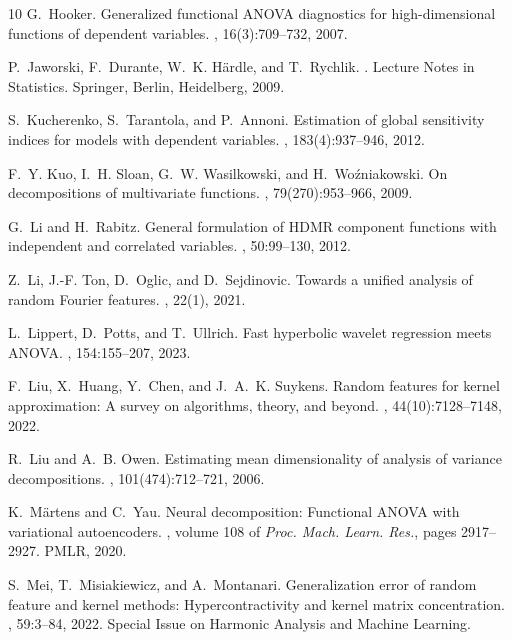 \documentclass{article}
\theoremstyle{definition}
\numberwithin{equation}{section}
\begin{document}
\begin{thebibliography}{10}
G.~Hooker.
\newblock Generalized functional {ANOVA} diagnostics for high-dimensional
  functions of dependent variables.
, 16(3):709--732, 2007.

P.~Jaworski, F.~Durante, W.~K. Härdle, and T.~Rychlik.
.
\newblock Lecture Notes in Statistics. Springer, Berlin, Heidelberg, 2009.

S.~Kucherenko, S.~Tarantola, and P.~Annoni.
\newblock Estimation of global sensitivity indices for models with dependent
  variables.
, 183(4):937--946, 2012.

F.~Y. Kuo, I.~H. Sloan, G.~W. Wasilkowski, and H.~Wo{\'{z}}niakowski.
\newblock On decompositions of multivariate functions.
, 79(270):953--966, 2009.

G.~Li and H.~Rabitz.
\newblock General formulation of {HDMR} component functions with independent
  and correlated variables.
, 50:99–130, 2012.

Z.~Li, J.-F. Ton, D.~Oglic, and D.~Sejdinovic.
\newblock Towards a unified analysis of random {F}ourier features.
, 22(1), 2021.


L.~Lippert, D.~Potts, and T.~Ullrich.
\newblock Fast hyperbolic wavelet regression meets {ANOVA}.
, 154:155--207, 2023.

F.~Liu, X.~Huang, Y.~Chen, and J.~A.~K. Suykens.
\newblock Random features for kernel approximation: A survey on algorithms,
  theory, and beyond.
, 44(10):7128--7148,
  2022.

R.~Liu and A.~B. Owen.
\newblock Estimating mean dimensionality of analysis of variance
  decompositions.
, 101(474):712--721, 2006.

K.~M{\"{a}}rtens and C.~Yau.
\newblock Neural decomposition: Functional {ANOVA} with variational
  autoencoders.
, volume 108 of {\em Proc.
Mach. Learn. Res.}, pages 2917--2927. {PMLR}, 2020.

S.~Mei, T.~Misiakiewicz, and A.~Montanari.
\newblock Generalization error of random feature and kernel methods:
  Hypercontractivity and kernel matrix concentration.
, 59:3--84, 2022.
\newblock Special Issue on Harmonic Analysis and Machine Learning.


\end{thebibliography}
\end{document}
